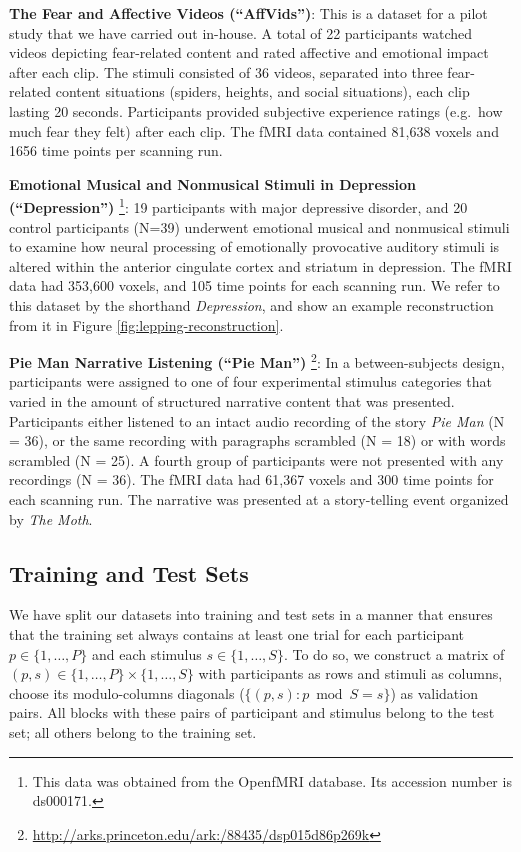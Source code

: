 \documentclass[twoside]{article}
\begin{document}
\textbf{The Fear and Affective Videos (``AffVids'')}: This is a dataset for a pilot study that we have carried out in-house. A total of 22 participants watched videos depicting fear-related content and rated affective and emotional impact after each clip. The stimuli consisted of 36 videos, separated into three fear-related content situations (spiders, heights, and social situations), each clip lasting 20 seconds. Participants provided subjective experience ratings (e.g.~how much fear they felt) after each clip. The fMRI data contained 81,638 voxels and 1656 time points per scanning run.

\textbf{Emotional Musical and Nonmusical Stimuli in Depression (``Depression'')}
\citep{10.1371/journal.pone.0156859}\footnote{This data was obtained from the OpenfMRI database. Its accession number is ds000171.}: 19 participants with major depressive disorder, and 20 control participants (N=39) underwent emotional musical and nonmusical stimuli to examine how neural processing of emotionally provocative auditory stimuli is altered within the anterior cingulate cortex and striatum in depression.  The fMRI data had 353,600 voxels, and 105 time points for each scanning run.  We refer to this dataset by the shorthand \emph{Depression}, and show an example reconstruction from it in Figure \ref{fig:lepping-reconstruction}.

\textbf{Pie Man Narrative Listening (``Pie Man'')} \citep{simony2016dynamic}\footnote{\scriptsize \url{http://arks.princeton.edu/ark:/88435/dsp015d86p269k}}: In a between-subjects design, participants were assigned to one of four experimental stimulus categories that varied in the amount of structured narrative content that was presented. Participants either listened to an intact audio recording of the story \emph{Pie Man} (N = 36), or the same recording with paragraphs scrambled (N = 18) or with words scrambled (N = 25). A fourth group of participants were not presented with any recordings (N = 36). The fMRI data had 61,367 voxels and 300 time points for each scanning run. The narrative was presented at a story-telling event organized by \emph{The Moth}.

\vspace{-1em}
\subsection{Training and Test Sets}
\label{subsec:train_val_sets}
\vspace{-1em}

We have split our datasets into training and test sets in a manner that ensures that the training set always contains at least one trial for each participant $p \in \{1,\ldots,P\}$ and each stimulus $s \in \{1,\ldots,S\}$.  To do so, we construct a matrix of $(p,s) \in \{1,\ldots,P\}\times \{1,\ldots,S\}$ with participants as rows and stimuli as columns, choose its modulo-columns diagonals ($\{(p, s) : p \bmod S = s \}$) as validation pairs.  All blocks with these pairs of participant and stimulus belong to the test set; all others belong to the training set.
\end{document}
